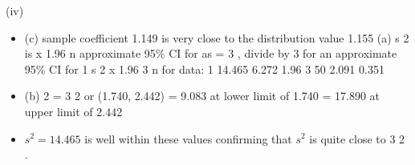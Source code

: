 \documentclass[a4paper,12pt]{article}
\begin{document}
(iv)

\begin{itemize}
\item (c) sample coefficient 1.149 is very close to the distribution value 1.155
(a) s 2
is x 1.96
n
approximate 95\% CI for
as
= 3 , divide by 3 for an approximate 95\% CI for
1
s 2
x 1.96
3
n
for data:
1
14.465
6.272 1.96
3
50
2.091 0.351
\item (b)
2
= 3
2
or
(1.740, 2.442)
= 9.083 at lower limit of 1.740
= 17.890 at upper limit of 2.442

\item $s^2 = 14.465$ is well within these values confirming that $s^2$ is quite close to 3 2 .
\end{itemize}
\end{document}
